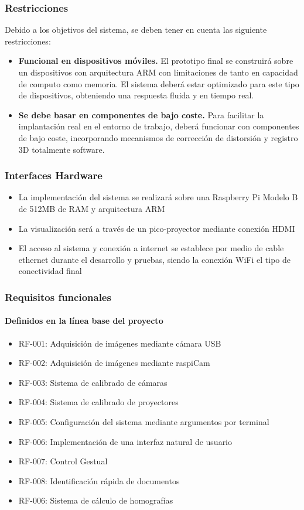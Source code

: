 \subsubsection{Restricciones}
Debido a los objetivos del sistema, se deben tener en cuenta las siguiente restricciones:
\begin{itemize}
\item\textbf{Funcional en dispositivos móviles.} El prototipo final se construirá sobre un dispositivos con arquitectura ARM con limitaciones de tanto en capacidad de computo como memoria. El sistema deberá estar optimizado para este tipo de dispositivos, obteniendo una respuesta fluida y en tiempo real.   
  
\item\textbf{Se debe basar en componentes de bajo coste.} Para facilitar la implantación real en el entorno de trabajo, deberá funcionar con componentes de bajo coste, incorporando mecanismos de corrección de distorsión y registro 3D totalmente software.
\end{itemize}

\subsubsection{Interfaces Hardware}
\begin{itemize}
\item La implementación del sistema se realizará sobre una Raspberry Pi Modelo B de 512MB de RAM y arquitectura ARM 
\item La visualización será a través de un pico-proyector mediante conexión HDMI
\item El acceso al sistema y conexión a internet se establece por medio de cable ethernet durante el desarrollo y pruebas, siendo la conexión WiFi el tipo de conectividad final
\end{itemize}

\subsubsection{Requisitos funcionales}
\paragraph{Definidos en la línea base del proyecto}
\begin{itemize}
\item RF-001: Adquisición de imágenes mediante cámara USB
\item RF-002: Adquisición de imágenes mediante raspiCam
\item RF-003: Sistema de calibrado de cámaras
\item RF-004: Sistema de calibrado de proyectores
\item RF-005: Configuración del sistema mediante argumentos por terminal
\item RF-006: Implementación de una interfaz natural de usuario
\item RF-007: Control Gestual
\item RF-008: Identificación rápida de documentos
\item RF-006: Sistema de cálculo de homografías
\end{itemize}

